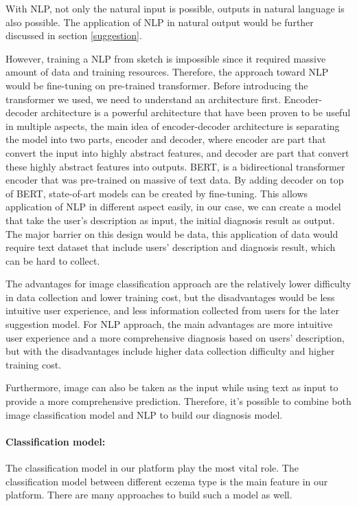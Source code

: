                     With NLP, not only the natural input is possible, outputs in natural language is also possible. The application of NLP in natural output would be further discussed in section \ref{suggestion}.

                    However, training a NLP from sketch is impossible since it required massive amount of data and training resources. Therefore, the approach toward NLP would be fine-tuning on pre-trained transformer. Before introducing the transformer we used, we need to understand an architecture first. Encoder-decoder architecture is a powerful architecture that have been proven to be useful in multiple aspects, the main idea of encoder-decoder architecture is separating the model into two parts, encoder and decoder, where encoder are part that convert the input into highly abstract features, and decoder are part that convert these highly abstract features into outputs. BERT\cite{devlin2019bert}, is a bidirectional transformer encoder that was pre-trained on massive of text data. By adding decoder on top of BERT, state-of-art models can be created by fine-tuning. This allows application of NLP in different aspect easily, in our case, we can create a model that take the user's description as input, the initial diagnosis result as output. The major barrier on this design would be data, this application of data would require text dataset that include users' description and diagnosis result, which can be hard to collect.

                    The advantages for image classification approach are the relatively lower difficulty in data collection and lower training cost, but the disadvantages would be less intuitive user experience, and less information collected from users for the later suggestion model. For NLP approach, the main advantages are more intuitive user experience and a more comprehensive diagnosis based on users' description, but with the disadvantages include higher data collection difficulty and higher training cost.

                    Furthermore, image can also be taken as the input while using text as input to provide a more comprehensive prediction. Therefore, it's possible to combine both image classification model and NLP to build our diagnosis model.
                \paragraph{Classification model:}
                    The classification model in our platform play the most vital role. The classification model between different eczema type is the main feature in our platform. There are many approaches to build such a model as well. 

